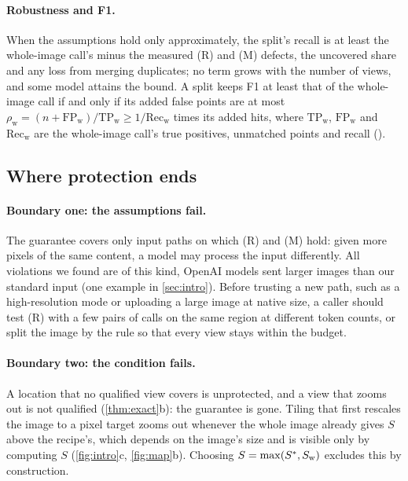 \paragraph{Robustness and F1.} When the assumptions hold only approximately, the split's recall is at least the whole-image call's minus the measured (R) and (M) defects, the uncovered share and any loss from merging duplicates; no term grows with the number of views, and some model attains the bound. A split keeps F1 at least that of the whole-image call if and only if its added false points are at most $\rho_{\mathrm{w}} = (n + \mathrm{FP}_{\mathrm{w}})/\mathrm{TP}_{\mathrm{w}} \ge 1/\mathrm{Rec}_{\mathrm{w}}$ times its added hits, where $\mathrm{TP}_{\mathrm{w}}$, $\mathrm{FP}_{\mathrm{w}}$ and $\mathrm{Rec}_{\mathrm{w}}$ are the whole-image call's true positives, unmatched points and recall ().

\subsection{Where protection ends}

\paragraph{Boundary one: the assumptions fail.} The guarantee covers only input paths on which (R) and (M) hold: given more pixels of the same content, a model may process the input differently. All \XtcViol{} violations we found are of this kind, OpenAI models sent larger images than our standard input (one example in \cref{sec:intro}). Before trusting a new path, such as a high-resolution mode or uploading a large image at native size, a caller should test (R) with a few pairs of calls on the same region at different token counts, or split the image by the rule so that every view stays within the budget.

\paragraph{Boundary two: the condition fails.} A location that no qualified view covers is unprotected, and a view that zooms out is not qualified (\cref{thm:exact}b): the guarantee is gone. Tiling that first rescales the image to a pixel target zooms out whenever the whole image already gives $S$ above the recipe's, which depends on the image's size and is visible only by computing $S$ (\cref{fig:intro}c, \cref{fig:map}b). Choosing $S = \max(S^\ast, S_{\mathrm{w}})$ excludes this by construction.
